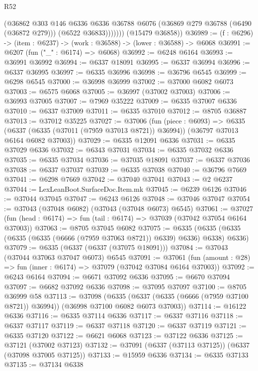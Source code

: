 \begin{lexlean}{R52}
\begin{coremodule}
                (@36862
                  @303
                  @146
                  @6336
                  @6336
                  @36788
                  @6076
                  (@36869 @279 @36788 (@6490 (@36872 @279)))
                  (@6522 @36833)))))))
      (@15479 @36858))
@36989 := (f : @6296) -> (item : @6237) -> (work : @36588) -> (lower : @36588) -> @6068
@36991 := @6207 (fun ("_" : @6174) => @6068)
@36992 := @6248 @6164
@36993 := @36991 @36992
@36994 := @6337 @18091
@36995 := @6337 @36994
@36996 := @6337 @36995
@36997 := @6335 @36996
@36998 := @36796 @6545
@36999 := @6298 @6545
@37000 := @36998 @36999
@37002 := @37000 @6082 @6073
@37003 := @6575 @6068
@37005 := @36997 (@37002 @37003)
@37006 := @36993 @37005
@37007 := @7969 @35222
@37009 := @6335 @37007 @6336
@37010 := @6337 @37009
@37011 := @6335 @37010
@37012 := @8705 @36887
@37013 := @37012 @35225
@37027 := @37006
    (fun (piece : @6093) =>
    @6335 (@6337 (@6335 (@37011 (@7959 @37013 @8721)) @36994)) (@36797 @37013 @6164 @6082 @37003))
@37029 := @6335 @12091 @6336
@37031 := @6335 @37029 @6336
@37032 := @6343 @37031
@37034 := @6335 @37032 @6336
@37035 := @6335 @37034
@37036 := @37035 @18091
@37037 := @6337 @37036
@37038 := @6337 @37037
@37039 := @6335 @37038
@37040 := @36796 @7669
@37041 := @6298 @7669
@37042 := @37040 @37041
@37043 := @2 @6237
@37044 := LexLeanBoot.SurfaceDoc.Item.mk
@37045 := @6239 @6126
@37046 := @37044 @37045
@37047 := @6243 @6126
@37048 := @37046 @37047
@37054 := @37043 (@37048 @6082) (@37043 (@37048 @6073) @6545)
@37061 := @37027 (fun (head : @6174) => fun (tail : @6174) => @37039 (@37042 @37054 @6164 @37003))
@37063 := @8705 @37045 @6082
@37075 := @6335 (@6335 (@6335 (@6335 (@6335 (@6666 (@7959 @37063 @8721)) @6339) @6336) @6338) @6336)
@37079 := @6335 (@6337 (@6337 (@37075 @18091)))
@37084 := @37043 (@37044 @37063 @37047 @6073) @6545
@37091 := @37061 (fun (amount : @28) => fun (inner : @6174) => @37079 (@37042 @37084 @6164 @37003))
@37092 := @6243 @6164
@37094 := @6671 @37092 @6336
@37095 := @6670 @37094
@37097 := @6682 @37092 @6336
@37098 := @37095 @37097
@37100 := @8705 @36999 @58
@37113 := @37098
    (@6335 (@6337 (@6335 (@6666 (@7959 @37100 @8721)) @36994)) (@36998 @37100 @6082 @6073 @37003))
@37114 := @16122 @6336
@37116 := @6335 @37114 @6336
@37117 := @6337 @37116
@37118 := @6337 @37117
@37119 := @6337 @37118
@37120 := @6337 @37119
@37121 := @6335 @37120
@37122 := @6621 @6068
@37123 := @37122 @6336
@37125 := @37121 (@37002 @37123)
@37132 := @37091 (@6337 (@37113 @37125)) (@6337 (@37098 @37005 @37125))
@37133 := @15959 @6336
@37134 := @6335 @37133
@37135 := @37134 @6338

\end{coremodule}
\end{lexlean}
